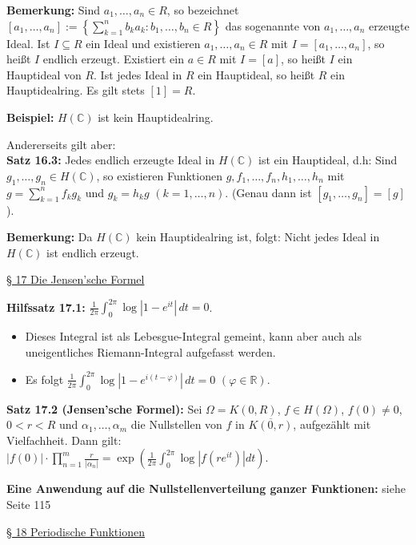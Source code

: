 \documentclass[11pt]{article}
\newcommand{\C}{\mathbb{C}}
\newcommand{\R}{\mathbb{R}}
\begin{document}
\textbf{Bemerkung:} Sind $a_1, \dots, a_n \in R$, so bezeichnet $[a_1, \dots, a_n] := \left\lbrace \sum_{k=1}^n b_k a_k \colon b_1, \dots , b_n \in R \right\rbrace$ das sogenannte von $a_1, \dots, a_n$ erzeugte Ideal. Ist $I \subseteq R$ ein Ideal und existieren $a_1, \dots , a_n \in R$ mit $I = [a_1, \dots , a_n]$, so heißt $I$ endlich erzeugt. Existiert ein $a \in R$ mit $I=[a]$, so heißt $I$ ein Hauptideal von $R$. Ist jedes Ideal in $R$ ein Hauptideal, so heißt $R$ ein Hauptidealring. Es gilt stets $[1] = R$.

\textbf{Beispiel:} $H(\C)$ ist kein Hauptidealring.

Andererseits gilt aber: \\
\textbf{Satz 16.3:} Jedes endlich erzeugte Ideal in $H(\C)$ ist ein Hauptideal, d.h: Sind $g_1, \dots, g_n \in H(\C)$, so existieren Funktionen $g, f_1, \dots, f_n, h_1, \dots, h_n$ mit $g = \sum_{k=1}^n f_k g_k$ und $g_k = h_k g$ $(k = 1, \dots , n)$. (Genau dann ist $[g_1, \dots , g_n] = [g]$).

\textbf{Bemerkung:} Da $H(\C)$ kein Hauptidealring ist, folgt: Nicht jedes Ideal in $H(\C)$ ist endlich erzeugt.

\underline{§ 17 Die Jensen'sche Formel}

\textbf{Hilfssatz 17.1:} $\frac{1}{2\pi} \int_0^{2\pi} \log |1-e^{it}| \, dt = 0$.
\vspace{-0.6cm}
\begin{itemize}
\item Dieses Integral ist als Lebesgue-Integral gemeint, kann aber auch als uneigentliches Riemann-Integral aufgefasst werden. \vspace{-0.2cm}
\item Es folgt $\frac{1}{2\pi} \int_0^{2\pi} \log |1-e^{i(t - \varphi)}| \, dt = 0$ $(\varphi \in \R)$.
\end{itemize}
\vspace{-0.3cm}

\textbf{Satz 17.2 (Jensen'sche Formel):} Sei $\Omega = K(0,R)$, $f \in H(\Omega)$, $f(0) \neq 0$, $0 < r < R$ und $\alpha_1, \dots , \alpha_m$ die Nullstellen von $f$ in $\overline{K(0,r)}$, aufgezählt mit Vielfachheit. Dann gilt: \\
$|f(0)| \cdot \prod_{n=1}^m \frac{r}{|\alpha_n|} = \exp (\frac{1}{2 \pi} \int_0^{2\pi} \log |f(re^{it})| dt)$.

\textbf{Eine Anwendung auf die Nullstellenverteilung ganzer Funktionen:} siehe Seite 115

\underline{§ 18 Periodische Funktionen}
\end{document}
